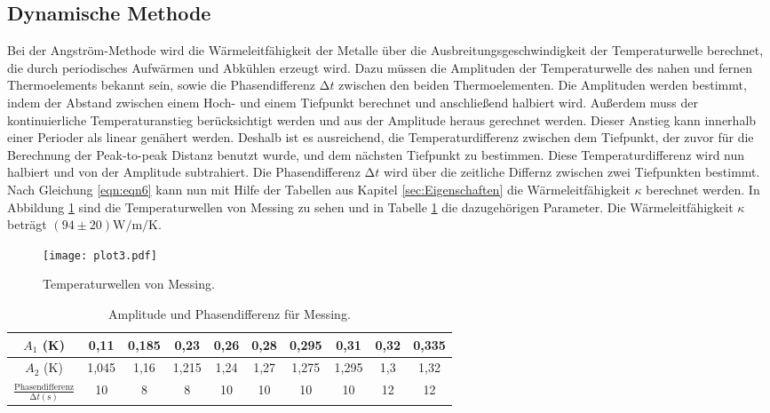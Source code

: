 \subsection{Dynamische Methode}
\label{sec:Auswertung_dynamisch}

Bei der Angström-Methode wird die Wärmeleitfähigkeit der Metalle über die Ausbreitungsgeschwindigkeit der Temperaturwelle berechnet, die durch periodisches Aufwärmen und Abkühlen erzeugt wird.
Dazu müssen die Amplituden der Temperaturwelle des nahen und fernen Thermoelements bekannt sein, sowie die Phasendifferenz $\increment t$ zwischen den beiden Thermoelementen.
Die Amplituden werden bestimmt, indem der Abstand zwischen einem Hoch- und einem Tiefpunkt berechnet und anschließend halbiert wird.
Außerdem muss der kontinuierliche Temperaturanstieg berücksichtigt werden und aus der Amplitude heraus gerechnet werden.
Dieser Anstieg kann innerhalb einer Perioder als linear genähert werden.
Deshalb ist es ausreichend, die Temperaturdifferenz zwischen dem Tiefpunkt, der zuvor für die Berechnung der Peak-to-peak Distanz benutzt wurde, und dem nächsten Tiefpunkt zu bestimmen.
Diese Temperaturdifferenz wird nun halbiert und von der Amplitude subtrahiert.
Die Phasendifferenz $\increment t$ wird über die zeitliche Differnz zwischen zwei Tiefpunkten bestimmt.
Nach Gleichung \eqref{eqn:eqn6} kann nun mit Hilfe der Tabellen aus Kapitel \ref{sec:Eigenschaften} die Wärmeleitfähigkeit $\kappa$ berechnet werden.
In Abbildung \ref{fig:plot3} sind die Temperaturwellen von Messing zu sehen und in Tabelle \ref{tab:Messing} die dazugehörigen Parameter.
Die Wärmeleitfähigkeit $\kappa$ beträgt $ (94 \pm 20) \si{\watt\per\meter\per\kelvin}$.
\begin{figure}
  \centering
  \texttt{[image: plot3.pdf]}
  \caption{Temperaturwellen von Messing.}
  \label{fig:plot3}
\end{figure}
\begin{table}
  \centering
  \caption{Amplitude und Phasendifferenz für Messing.}
  \label{tab:Messing}
  \begin{tabular}{c c c c c c c c c c}
    \toprule
    $A_1$ (\si{\kelvin}) &  0,11 & 0,185 & 0,23 & 0,26 & 0,28 & 0,295 & 0,31 & 0,32 & 0,335 \\
    \midrule
    $A_2$ (\si{\kelvin}) & 1,045 & 1,16 & 1,215 & 1,24 & 1,27 & 1,275 & 1,295 & 1,3 & 1,32 \\
    \bottomrule
    $\frac{\text{Phasendifferenz}}{\increment t (\si{\second})}$ & 10 & 8 & 8 & 10 & 10 & 10 & 10 & 12 & 12 \\
  \end{tabular}
\end{table}
